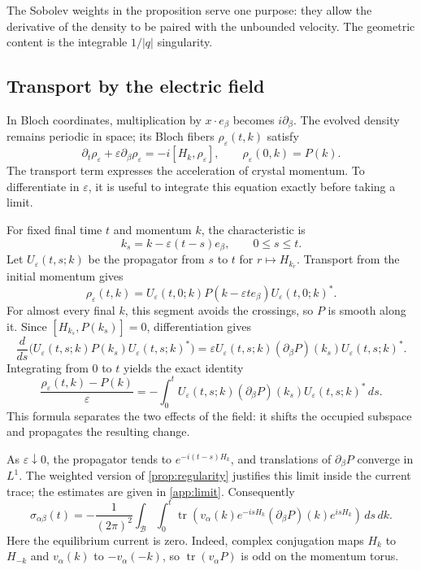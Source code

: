 \documentclass[11pt,a4paper]{article}
\DeclareMathOperator{\tr}{tr}
\theoremstyle{remark}
\numberwithin{equation}{section}
\begin{document}
The Sobolev weights in the proposition serve one purpose: they allow
the derivative of the density to be paired with the unbounded velocity.
The geometric content is the integrable $1/|q|$ singularity.

\subsection{Transport by the electric field}

In Bloch coordinates, multiplication by $x\cdot e_\beta$ becomes
$i\partial_\beta$. The evolved density remains periodic in space;
its Bloch fibers $\rho_\varepsilon(t,k)$ satisfy
\begin{equation}\label{eq:transport}
 \partial_t\rho_\varepsilon+\varepsilon\partial_\beta\rho_\varepsilon
    =-i[H_k,\rho_\varepsilon],
 \qquad \rho_\varepsilon(0,k)=P(k).
\end{equation}
The transport term expresses the acceleration of crystal momentum.
To differentiate in $\varepsilon$, it is useful to integrate this
equation exactly before taking a limit.

For fixed final time $t$ and momentum $k$, the characteristic is
\[
 k_s=k-\varepsilon(t-s)e_\beta,\qquad 0\le s\le t.
\]
Let $U_\varepsilon(t,s;k)$ be the propagator from $s$ to $t$ for
$r\mapsto H_{k_r}$. Transport from the initial momentum gives
\begin{equation}\label{eq:rho-characteristic}
 \rho_\varepsilon(t,k)=U_\varepsilon(t,0;k)
 P(k-\varepsilon t e_\beta)U_\varepsilon(t,0;k)^*.
\end{equation}
For almost every final $k$, this segment avoids the crossings, so $P$
is smooth along it. Since $[H_{k_s},P(k_s)]=0$, differentiation gives
\[
 \frac{d}{ds}\bigl(U_\varepsilon(t,s;k)P(k_s)U_\varepsilon(t,s;k)^*\bigr)
 =\varepsilon U_\varepsilon(t,s;k)(\partial_\beta P)(k_s)
 U_\varepsilon(t,s;k)^*.
\]
Integrating from $0$ to $t$ yields the exact identity
\begin{equation}\label{eq:source}
 \frac{\rho_\varepsilon(t,k)-P(k)}{\varepsilon}
 =-\int_0^t U_\varepsilon(t,s;k)
 (\partial_\beta P)(k_s)
 U_\varepsilon(t,s;k)^*\,ds.
\end{equation}
This formula separates the two effects of the field: it shifts the
occupied subspace and propagates the resulting change.

As $\varepsilon\downarrow0$, the propagator tends to
$e^{-i(t-s)H_k}$, and translations of $\partial_\beta P$ converge in
$L^1$. The weighted version of \cref{prop:regularity} justifies this
limit inside the current trace; the estimates are given in
\cref{app:limit}. Consequently
\begin{equation}\label{eq:response-projection}
 \sigma_{\alpha\beta}(t)
 =-\frac1{(2\pi)^2}\int_{\mathcal B}\int_0^t
 \tr\!\left(v_\alpha(k)e^{-isH_k}
       (\partial_\beta P)(k)e^{isH_k}\right)\,ds\,dk.
\end{equation}
Here the equilibrium current is zero. Indeed, complex conjugation
maps $H_k$ to $H_{-k}$ and $v_\alpha(k)$ to $-v_\alpha(-k)$,
so $\tr(v_\alpha P)$ is odd on the momentum torus.
\end{document}
